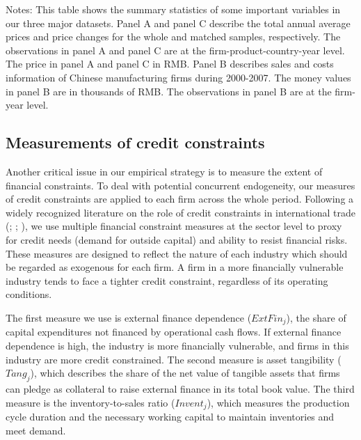 \documentclass[12pt]{article}
\begin{document}
\begin{table}[htbp]
{\begin{threeparttable}
\begin{tabular}{lcccccc}
		\bottomrule
	\end{tabular}
	\begin{tablenotes}
		\footnotesize
		\item[Notes:] This table shows the summary statistics of some important variables in our three major datasets. Panel A and panel C describe the total annual average prices and price changes for the whole and matched samples, respectively. The observations in panel A and panel C are at the firm-product-country-year level. The price in panel A and panel C in RMB. Panel B describes sales and costs information of Chinese manufacturing firms during 2000-2007. The money values in panel B are in thousands of RMB. The observations in panel B are at the firm-year level.
	\end{tablenotes}
	\end{threeparttable}
        }
\end{table}

\subsection{Measurements of credit constraints} \label{Measurements-Credit Constraints}

Another critical issue in our empirical strategy is to measure the extent of financial constraints. To deal with potential concurrent endogeneity, our measures of credit constraints are applied to each firm across the whole period. Following a widely recognized literature on the role of credit constraints in international trade (\cite{kroszner2007}; \cite{manova-wei-zhang2015}; \cite{fan-lai-li2015}), we use multiple financial constraint measures at the sector level to proxy for credit needs (demand for outside capital) and ability to resist financial risks. These measures are designed to reflect the nature of each industry which should be regarded as exogenous for each firm. A firm in a more financially vulnerable industry tends to face a tighter credit constraint, regardless of its operating conditions.

The first measure we use is external finance dependence ($ExtFin_j$), the share of capital expenditures not financed by operational cash flows. If external finance dependence is high, the industry is more financially vulnerable, and firms in this industry are more credit constrained. The second measure is asset tangibility ($Tang_j$), which describes the share of the net value of tangible assets that firms can pledge as collateral to raise external finance in its total book value. The third measure is the inventory-to-sales ratio ($Invent_j$), which measures the production cycle duration and the necessary working capital to maintain inventories and meet demand. 
\end{document}
